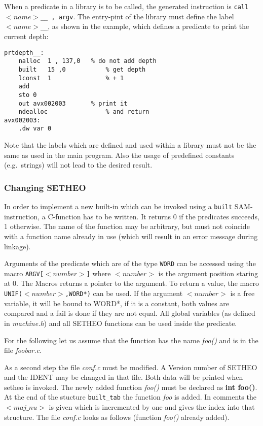 When a predicate in a library is to be called, the generated instruction
is {\tt call $<name>$\_\_ , argv}.
The entry-pint of the library must define the label
{\tt $<name>$\_\_}, as shown in the example, which defines
a predicate to print the current depth:

\begin{verbatim}
prtdepth__:
	nalloc	1 , 137,0	% do not add depth
	built	15 ,0           % get depth
	lconst  1               % + 1
	add
	sto	0
	out	avx002003       % print it
	ndealloc                % and return
avx002003:
	.dw	var	0
\end{verbatim}

Note that the labels which are defined and used within a library must
not be the same as used in the main program.
Also the usage of predefined constants (e.g.\ strings) will not lead
to the desired result.

\subsubsection{Changing SETHEO}

In order to implement a new built-in which can be invoked
using a {\tt built} SAM-instruction, a C-function has to be written.
It returns 0 if the predicates succeeds, 1 otherwise.
The name of the function may be arbitrary, but must not coincide with a function
name already in use (which will result in an error message during linkage).

Arguments of the predicate which are of the type {\tt WORD}
can be accessed using the macro {\tt ARGV[$<number>$]}
where $<number>$ is the argument position staring at 0.
The Macros returns a pointer to the argument.
To return a value, the macro {\tt UNIF($<number>$,WORD*)}
can be used. If the argument $<number>$ is a free variable,
it will be bound to WORD*, if it is a constant, both values are compared
and a fail is done if they are not equal.
All global variables (as defined in {\em machine.h\/})
and all SETHEO functions can be used inside the predicate.

For the following let us assume that the function has the name {\em foo()\/}
and is in the file {\em foobar.c}.

As a second step the file {\em conf.c\/} must be modified.
A Version number of SETHEO and the IDENT may be changed
in that file. Both data will be printed when setheo is invoked.
The newly added function {\em foo()\/} must be declared as
{\bf int foo()}.
At the end of the stucture {\tt built\_tab}
the function {\em foo\/} is added.
In comments the $<maj\_nu>$ is given which is incremented by one and
gives the index into that structure.
The file {\em conf.c\/} looks as follows (function {\em foo()\/} already added).

